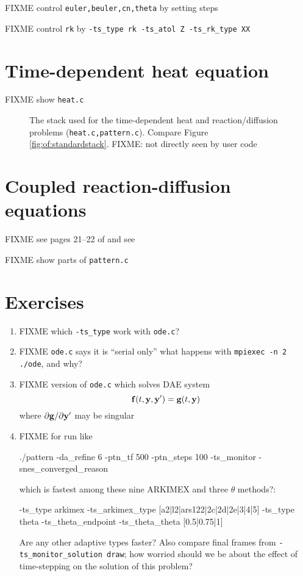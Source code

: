FIXME control \texttt{euler,beuler,cn,theta} by setting steps

FIXME control \texttt{rk} by \texttt{-ts\_type rk -ts\_atol Z -ts\_rk\_type XX}


\section{Time-dependent heat equation}

FIXME show \texttt{heat.c}

\begin{figure}
\caption{The \PETSc stack used for the time-dependent heat and reaction/diffusion problems (\texttt{heat.c,pattern.c}).  Compare Figure \ref{fig:of:standardstack}.  FIXME: \pSNES not directly seen by user code}
\label{fig:of:tsstack}
\end{figure}


\section{Coupled reaction-diffusion equations}

FIXME see pages 21--22 of \citep{HundsdorferVerwer2003} and see \citep{Pearson1993}

FIXME show parts of \texttt{pattern.c}


\section{Exercises}

\renewcommand{\labelenumi}{\arabic{chapter}.\arabic{enumi}\quad}
\renewcommand{\labelenumii}{(\alph{enumii})}
\begin{enumerate}
\item FIXME which \texttt{-ts\_type} work with \texttt{ode.c}?
\item FIXME \texttt{ode.c} says it is ``serial only''  what happens with \texttt{mpiexec -n 2 ./ode}, and why?
\item FIXME version of \texttt{ode.c} which solves DAE system
    $$\mathbf{f}(t,\mathbf{y},\mathbf{y}') = \mathbf{g}(t,\mathbf{y})$$
where $\partial \mathbf{g}/\partial \mathbf{y}'$ may be singular
\item FIXME for run like
\begin{cline}
./pattern -da_refine 6 -ptn_tf 500 -ptn_steps 100 -ts_monitor -snes_converged_reason
\end{cline}
which is fastest among these nine ARKIMEX and three $\theta$ methods?:
\begin{code}
-ts_type arkimex -ts_arkimex_type [a2|l2|ars122|2c|2d|2e|3|4|5]
-ts_type theta -ts_theta_endpoint -ts_theta_theta [0.5|0.75|1]
\end{code}
Are any other adaptive \pTS types faster?  Also compare final frames from \texttt{-ts\_monitor\_solution draw}; how worried should we be about the effect of time-stepping on the solution of this problem?
\end{enumerate}
